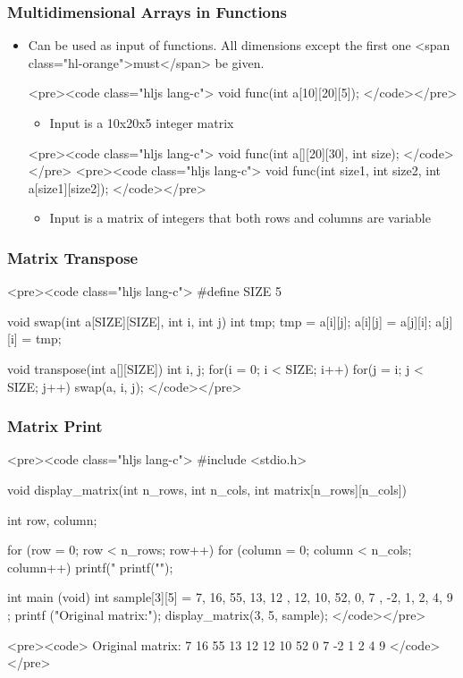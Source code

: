 \documentclass{../c-lecture}
\begin{document}
\begin{frame}
  \frametitle{Multidimensional Arrays in Functions}
  \begin{itemize}
    \item
      Can be used as input of functions. All dimensions except the first one
      <span class="hl-orange">must</span> be given.

    <pre><code class="hljs lang-c">
void func(int a[10][20][5]);
    </code></pre>
    \begin{itemize}
      \item Input is a 10x20x5 integer matrix
    \end{itemize}
    <pre><code class="hljs lang-c">
void func(int a[][20][30], int size);
    </code></pre>
    <pre><code class="hljs lang-c">
void func(int size1, int size2, int a[size1][size2]);
    </code></pre>
    \begin{itemize}
      \item
        Input is a matrix of integers that both rows and columns are variable

    \end{itemize}
  \end{itemize}
\end{frame}
\begin{frame}
  \frametitle{Matrix Transpose}
  <pre><code class="hljs lang-c">
#define SIZE 5

void swap(int a[SIZE][SIZE], int i, int j){
  int tmp;
  tmp = a[i][j];
  a[i][j] = a[j][i];
  a[j][i] = tmp;
}

void transpose(int a[][SIZE]){
  int i, j;
  for(i = 0; i < SIZE; i++)
    for(j = i; j < SIZE; j++)
      swap(a, i, j);
}
  </code></pre>
\end{frame}
\begin{frame}
  \begin{frame}
    \frametitle{Matrix Print}
    <pre><code class="hljs lang-c">
#include <stdio.h>

void display_matrix(int n_rows, int n_cols, int matrix[n_rows][n_cols]) {
  int row, column;

  for (row = 0; row < n_rows; row++) {
    for (column = 0; column < n_cols; column++)
      printf("%
    printf("\n");
  }
}

int main (void){
  int sample[3][5] =
    {
      { 7, 16, 55, 13, 12 },
      { 12, 10, 52, 0, 7 },
      { -2, 1, 2, 4, 9 }
    };
    printf ("Original matrix:\n");
    display_matrix(3, 5, sample);
}
    </code></pre>
  \end{frame}
  \begin{frame}
    <pre><code>
Original matrix:
    7    16    55    13    12
   12    10    52     0     7
   -2     1     2     4     9
    </code></pre>
  \end{frame}
\end{frame}
\end{document}
